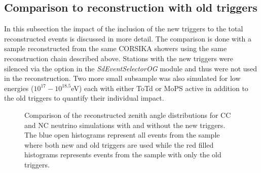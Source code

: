 \subsection{Comparison to reconstruction with old triggers}
\label{subsec:old_trig_comp}
In this subsection the impact of the inclusion of the new triggers to the total reconstructed events is discussed in more detail. The comparison is done with a sample reconstructed from the same CORSIKA showers using the same reconstruction chain described above. Stations with the new triggers were silenced via the option in the \textit{SdEventSelectorOG} module and thus were not used in the reconstruction. Two more small subsample was also simulated for low energies ($10^{17}-10^{18.5}$eV) each with either ToTd or MoPS active in addition to the old triggers to quantify their individual impact. 

\begin{figure}[h!]
  \centering
  \hfill
  \caption{Comparison of the reconstructed zenith angle distributions for CC and NC neutrino simulations with and without the new triggers. The blue open histograms represent all events from the sample where both new and old triggers are used while the red filled histograms represents events from the sample with only the old triggers.} 
  \label{fig:Rec_Theta_comp}
\end{figure}

